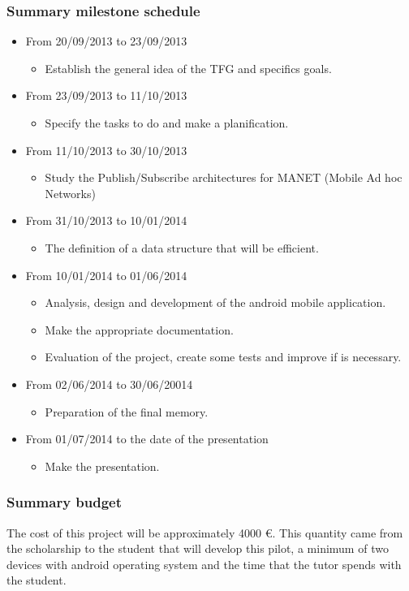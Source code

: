 \documentclass[draftclsnofoot,12pt,journal,onecolumn]{IEEEtran}
\begin{document}
\subsubsection{Summary milestone schedule}
\begin{itemize}
\item From 20/09/2013 to 23/09/2013
	\begin{itemize}
	\item Establish the general idea of the TFG and specifics goals.
	\end{itemize}
\item From 23/09/2013 to 11/10/2013
	\begin{itemize}
	\item Specify the tasks to do and make a planification.
	\end{itemize}
\item From 11/10/2013 to 30/10/2013
	\begin{itemize}
	\item Study the Publish/Subscribe architectures for MANET (Mobile Ad hoc Networks)
	\end{itemize}
\item From 31/10/2013 to 10/01/2014
	\begin{itemize}
	\item The definition of a data structure that will be efficient.
	\end{itemize}
\item From 10/01/2014 to 01/06/2014
	\begin{itemize}
	\item Analysis, design and development of the android mobile application.
	\item Make the appropriate documentation.
	\item Evaluation of the project, create some tests and improve if is necessary.
	\end{itemize}
\item From 02/06/2014 to 30/06/20014
	\begin{itemize}
	\item Preparation of the final memory.
	\end{itemize}
\item From 01/07/2014 to the date of the presentation
	\begin{itemize}
	\item Make the presentation.
	\end{itemize}
\end{itemize}

\subsubsection{Summary budget}
The cost of this project will be approximately 4000 €. This quantity came from the scholarship to the student that will develop this pilot, a minimum of two devices with android operating system and the time that the tutor spends with the student.
\end{document}
